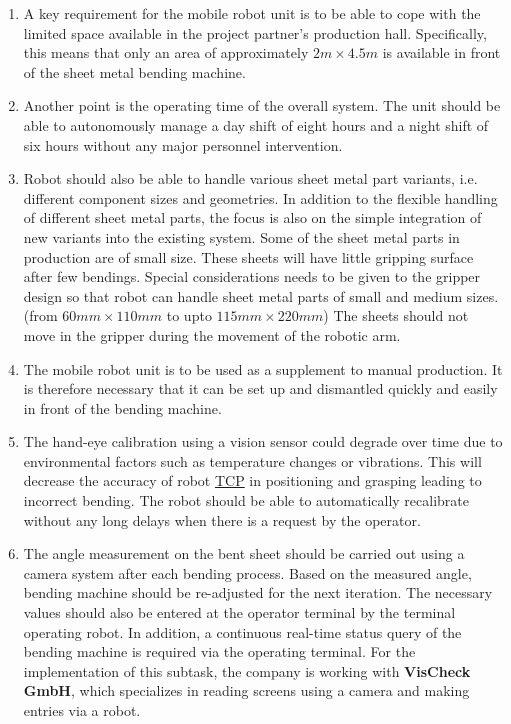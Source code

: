 \begin{enumerate}
    \item A key requirement for the mobile robot unit is to be able to cope with the limited space available in the
    project partner's production hall. Specifically, this means that only an area of approximately $2 m \times 4.5 m$ is
    available in front of the sheet metal bending machine.

    \item Another point is the operating time of the overall system. The unit should be able to autonomously
    manage a day shift of eight hours and a night shift of six hours without any major personnel
    intervention.

    \item Robot should also be able to handle various sheet metal part variants, i.e. different component sizes and
    geometries. In addition to the flexible handling of different sheet metal parts, the focus is also on the
    simple integration of new variants into the existing system. Some of the sheet metal parts in production are
    of small size. These sheets will have little gripping surface after few bendings. Special considerations needs to be given to the
    gripper design so that robot can handle sheet metal parts of small and medium sizes. (from $60 mm \times 110 mm$ to upto $115 mm \times 220 mm$)
    The sheets should not move in the gripper during the movement of the robotic arm.

    \item 
    The mobile robot unit is to be used as a supplement to manual production. It is therefore necessary
    that it can be set up and dismantled quickly and easily in front of the bending machine.

    \item The hand-eye calibration using a vision sensor could degrade over time due to environmental factors such as temperature changes or vibrations. \cite{Bahadir2024}
    This will decrease the accuracy of robot \hyperref[acro:TCP]{TCP} in positioning and grasping leading to incorrect bending.
    The robot should be able to automatically recalibrate without any long delays when there is a request by the operator.
    
    \item The angle measurement on the bent sheet should be carried out using a camera system
    after each bending process. Based on the measured angle, bending machine should be re-adjusted for the next iteration. The
    necessary values should also be entered at the operator terminal by the terminal operating robot. In addition, a
    continuous real-time status query of the bending machine is required via the operating terminal. For
    the implementation of this subtask, the company is working with \textbf{VisCheck GmbH}, which specializes in
    reading screens using a camera and making entries via a robot.
    
\end{enumerate}






